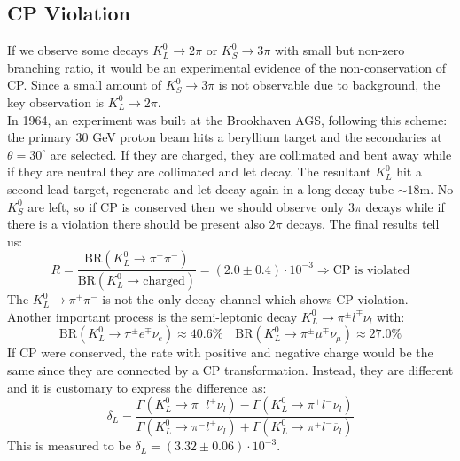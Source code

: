 \documentclass[10.75pt,a4paper,openright,bottom=2cm]{article}
\begin{document}
\subsection{CP Violation}
If we observe some decays $K_L^0\to2\pi$ or $K_S^0\to3\pi$ with small but non-zero branching ratio, it would be an experimental evidence of the non-conservation of CP. Since a small amount of $K_S^0\to3\pi$ is not observable due to background, the key observation is $K_L^0\to2\pi$.\\
In 1964, an experiment was built at the Brookhaven AGS, following this scheme: the primary 30 GeV proton beam hits a beryllium target and the secondaries at $\theta=30^\circ$ are selected. If they are charged, they are collimated and bent away while if they are neutral they are collimated and let decay. The resultant $K_L^0$ hit a second lead target, regenerate and let decay again in a long decay tube $\sim18$\;m. No $K_S^0$  are left, so if CP is conserved then we should observe only $3\pi$ decays while if there is a violation there should be present also $2\pi$ decays. The final results tell us:
\[
R=\frac{\text{BR}(K_L^0\to\pi^+\pi^-)}{\text{BR}(K_L^0\to\text{charged})}=(2.0\pm0.4)\cdot10^{-3}\Rightarrow\text{CP is violated}
\]
The $K_L^0\to\pi^+\pi^-$ is not the only decay channel which shows CP violation. Another important process is the semi-leptonic decay $K_L^0\to\pi^\pm l^\mp\nu_l$ with:
\[
\text{BR}(K_L^0\to\pi^\pm e^\mp\nu_e)\approx40.6\% \quad \text{BR}(K_L^0\to\pi^\pm\mu^\mp\nu_\mu)\approx27.0\%
\]
If CP were conserved, the rate with positive and negative charge would be the same since they are connected by a CP transformation. Instead, they are different and it is customary to express the difference as:
\[
\delta_L=\frac{\Gamma(K_L^0\to\pi^- l^+\nu_l)-\Gamma(K_L^0\to\pi^+ l^-\overline{\nu}_l)}{\Gamma(K_L^0\to\pi^- l^+\nu_l)+\Gamma(K_L^0\to\pi^+ l^-\overline{\nu}_l)}
\]
This is measured to be $\delta_L=(3.32\pm0.06)\cdot10^{-3}$.
\end{document}
